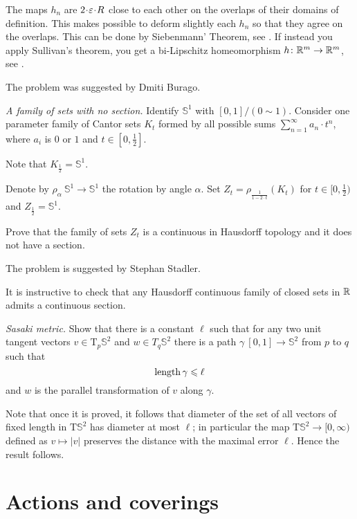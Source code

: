 The maps $h_n$ are $2\cdot \eps\cdot R$ close to each other on the overlaps of their domains of definition.
This makes possible to deform slightly each $h_n$ so that they agree on the overlaps.
This can be done by Siebenmann' Theorem, see \cite{siebenmann}.
If instead you apply Sullivan's theorem, you get a bi-Lipschitz homeomorphism $h\colon\mathbb{R}^m\to\mathbb{R}^m$,
see \cite{sullivan}.


The problem was suggested by Dmiti Burago.





\textit{A family of sets with no section.}
Identify $\mathbb{S}^1$ with $[0,1]/(0\sim 1)$.
Consider one parameter family of Cantor sets $K_t$
formed by all possible sums $\sum_{n=1}^\infty a_n\cdot t^n$,
where $a_i$ is $0$ or $1$ and $t\in[0,\tfrac12]$.

Note that $K_{\frac12}=\mathbb{S}^1$.

Denote by $\rho_\alpha\:\mathbb{S}^1\to\mathbb{S}^1$ 
the rotation by angle $\alpha$.
Set $Z_t=\rho_{\frac1{1-2\cdot t}}(K_t)$ for $t\in[0,\tfrac12)$ and $Z_{\frac12}=\mathbb{S}^1$.

Prove that the family of sets $Z_t$
is a continuous in Hausdorff topology and it does not have a section.

 The problem is suggested by Stephan Stadler.

It is instructive to check that any Hausdorff continuous family of closed sets in $\mathbb{R}$ admits a continuous section.



\textit{Sasaki metric.}
Show that there is a constant $\ell$
such that for any two unit tangent vectors $v\in\mathrm{T}_p\mathbb{S}^2$ 
and $w\in T_q\mathbb{S}^2$
there is a path 
$\gamma\:[0,1]\to\mathbb{S}^2$ from $p$ to $q$
such that 
\[\operatorname{\rm length} \gamma\leqslant \ell\] 
and
$w$ is the parallel transformation of $v$ along $\gamma$.

Note that once it is proved, 
it follows that diameter of the set of all vectors of fixed length in $\mathrm{T} \mathbb{S}^2$ has diameter at most $\ell$;
in particular the map $\mathrm{T}\mathbb{S}^2\to[0,\infty)$ defined as $v\mapsto |v|$ 
preserves the distance with the maximal error $\ell$.
Hence the result follows.

\section*{Actions and coverings}




